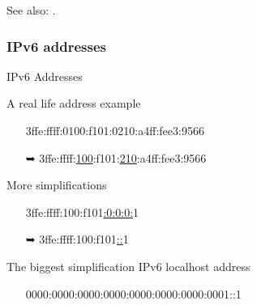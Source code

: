See also: .

\subsubsection{IPv6 addresses}

\begin{frame}{IPv6 Addresses}
 \begin{iblock}{A real life address example}{\ttfamily
    \begin{itemize}
    \item[] 3ffe:ffff:0100:f101:0210:a4ff:fee3:9566
    \item[{\dejavu ➥}]
      3ffe:ffff:\underline{100}:f101:\underline{210}:a4ff:fee3:9566
    \end{itemize}}
 \end{iblock}
 \begin{iblock}{More simplifications}{\ttfamily
    \begin{itemize}
    \item[] 3ffe:ffff:100:f101\underline{:0:0:0:}1
    \item[{\dejavu ➥}] 3ffe:ffff:100:f101\underline{::}1
    \end{itemize}}
 \end{iblock}
 \begin{iblock}{The biggest simplification}
   IPv6 localhost address{\ttfamily
     \begin{itemize}
     \item[] 0000:0000:0000:0000:0000:0000:0000:0001\quad ::1
     \end{itemize}}
 \end{iblock}
\end{frame}


